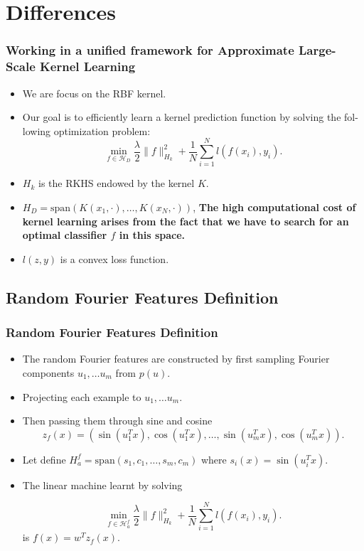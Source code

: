 \section{Differences}

\begin{frame}
  \frametitle{Working in a unified framework for Approximate Large-Scale Kernel Learning}
  \begin{itemize}
    \item We are focus on the RBF kernel.
    \item Our goal is to efficiently learn a kernel prediction function by solving the fol-
    lowing optimization problem: 
    \begin{equation}
      \min_{f \in \mathcal{H}_D}
        \frac{\lambda}{2} \|f\|^2_{H_k} 
        +
        \frac{1}{N}
          \sum_{i = 1}^N 
            l(f(x_i), y_i).
    \end{equation}
    \item  $H_k$ is the RKHS endowed by the kernel $K$. 
    \item $H_D = \text{span}(K(x_1, \cdot), \ldots, K(x_N, \cdot))$, \bf{The high computational cost of kernel learning arises from the fact that we have to search for an optimal classifier $f$ in this space.}
    \item $l(z,y)$ is a convex loss function. 
  \end{itemize}

\end{frame}

\subsection{Random Fourier Features Definition}


\begin{frame}
  \frametitle{Random Fourier Features Definition}
\begin{itemize}
  \item The random Fourier features are constructed by first sampling Fourier components $u_1, \ldots u_m$ from $p(u)$. 
  \item Projecting each example to  $u_1, \ldots u_m$.
  \item Then passing them through sine and cosine 
  \begin{equation}
    z_f(x) = \left(
      \sin(u_1^T x), \cos(u_1^T x), 
      \ldots,
      \sin(u_m^T x), \cos(u_m^T x)
    \right).
  \end{equation}
  \item Let define $H_a^f = \text{span}(s_1, c_1, \ldots, s_m, c_m)$ where $s_i(x) = \sin(u_i^T x)$.
  \item The linear machine learnt by solving 
 
    \begin{equation}
      \min_{f \in \mathcal{H}_a^f}
        \frac{\lambda}{2} \|f\|^2_{H_k} 
        +
        \frac{1}{N}
          \sum_{i = 1}^N 
            l(f(x_i), y_i).
  \end{equation}
  is $f(x) = w^T z_f(x)$.
\end{itemize}

\end{frame}

